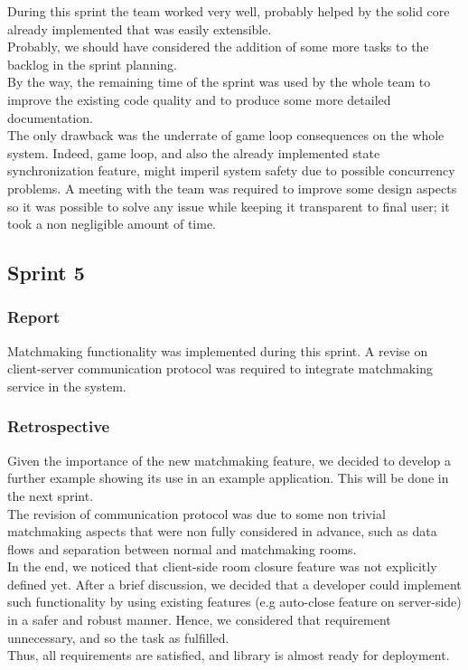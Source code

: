 During this sprint the team worked very well, probably helped by the solid core already implemented that was easily extensible.
\\
Probably, we should have considered the addition of some more tasks to the backlog in the sprint planning.
\\
By the way, the remaining time of the sprint was used by the whole team to improve the existing code quality and to produce some more detailed documentation.
\\
The only drawback was the underrate of game loop consequences on the whole system. Indeed, game loop, and also the already implemented state synchronization feature, might imperil system safety due to possible concurrency problems. A meeting with the team was required to improve some design aspects so it was possible to solve any issue while keeping it transparent to final user; it took a non negligible amount of time.

\subsection{Sprint 5}

\subsubsection{Report}
Matchmaking functionality was implemented during this sprint.
A revise on client-server communication protocol was required to integrate matchmaking service in the system.

\subsubsection{Retrospective}

Given the importance of the new matchmaking feature, we decided to develop a further example showing its use in an example application. This will be done in the next sprint.
\\
The revision of communication protocol was due to some non trivial matchmaking aspects that were non fully considered in advance, such as data flows and separation between normal and matchmaking rooms. 
\\
In the end, we noticed that client-side room closure feature was not explicitly defined yet. 
After a brief discussion, we decided that a developer could implement such functionality by using existing features (e.g auto-close feature on server-side) in a safer and robust manner. Hence, we considered that requirement unnecessary, and so the task as fulfilled.
\\
Thus, all requirements are satisfied, and library is almost ready for deployment.


